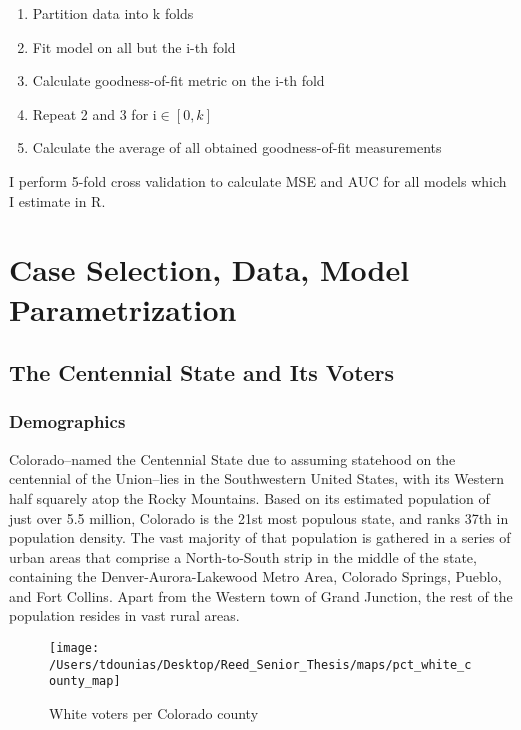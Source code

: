 \documentclass[12pt,twoside]{reedthesis}
\begin{document}
  \begin{enumerate}
  \item Partition data into k folds
  \item Fit model on all but the i-th fold
  \item Calculate goodness-of-fit metric on the i-th fold
  \item Repeat 2 and 3 for i$\in [0,k]$
  \item Calculate the average of all obtained goodness-of-fit measurements
  \end{enumerate}
  
  I perform 5-fold cross validation to calculate MSE and AUC for all
  models which I estimate in R.
  
  \chapter{Case Selection, Data, Model
  Parametrization}\label{case-selection-data-model-parametrization}
  
  \section{The Centennial State and Its
  Voters}\label{the-centennial-state-and-its-voters}
  
  \subsection{Demographics}\label{demographics}
  
  Colorado--named the Centennial State due to assuming statehood on the
  centennial of the Union--lies in the Southwestern United States, with
  its Western half squarely atop the Rocky Mountains. Based on its
  estimated population of just over 5.5 million, Colorado is the 21st most
  populous state, and ranks 37th in population density. The vast majority
  of that population is gathered in a series of urban areas that comprise
  a North-to-South strip in the middle of the state, containing the
  Denver-Aurora-Lakewood Metro Area, Colorado Springs, Pueblo, and Fort
  Collins. Apart from the Western town of Grand Junction, the rest of the
  population resides in vast rural areas.
  
  \begin{figure}
  
  {\centering \texttt{[image: /Users/tdounias/Desktop/Reed\_Senior\_Thesis/maps/pct\_white\_county\_map]} 
  
  }
  
  \caption[White voters per Colorado county]{White voters per Colorado county}\label{fig:white pct map}
  \end{figure}
  
\end{document}

